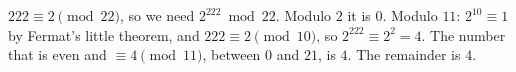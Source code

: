 $222\equiv2\pmod{22}$, so we need $2^{222}\bmod22$. Modulo $2$ it is $0$. Modulo $11$: $2^{10}\equiv1$ by Fermat's little theorem, and $222\equiv2\pmod{10}$, so $2^{222}\equiv2^2=4$. The number that is even and $\equiv4\pmod{11}$, between $0$ and $21$, is $4$. The remainder is $\boxed{4}$.
